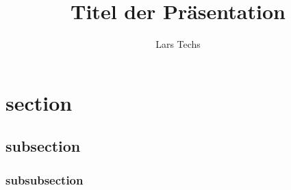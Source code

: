 \documentclass{beamer}
\author{Lars Techs}
\institute{Freie Universität Berlin}
\title{Titel der Präsentation}
\begin{document}
\section{section }
\subsection{subsection}
\subsubsection{subsubsection}
  
\lspbeamertitle

% 
 
\end{document}
